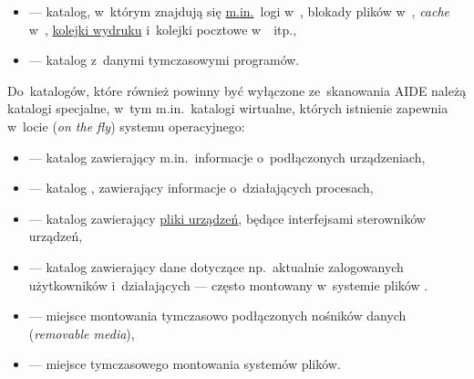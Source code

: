 \documentclass[thesis]{subfiles}
\begin{document}
\begin{itemize}
	\item {} --- katalog, w~którym znajdują się \href{http://www.linuxpl.org/SAG/x547.html}{m.in.}~logi w~, blokady plików w~, \emph{cache} w~, \href{http://www.tldp.org/HOWTO/Printing-Usage-HOWTO-2.html}{kolejki wydruku} i~kolejki pocztowe w~~itp.,
	\item {} --- katalog z~danymi tymczasowymi programów.
\end{itemize}

 Do~katalogów, które również powinny być wyłączone ze~skanowania AIDE należą katalogi specjalne, w~tym m.in.~katalogi wirtualne, których istnienie zapewnia w~locie (\emph{on the fly})  systemu operacyjnego:\mynobreakpar

\begin{itemize}
	\item {} --- katalog zawierający m.in.~informacje o~podłączonych urządzeniach,
	\item {} --- katalog , zawierający informacje o~działających procesach,
	\item {} --- katalog zawierający \href{https://en.wikipedia.org/wiki/Device_file}{pliki urządzeń}, będące interfejsami sterowników urządzeń,
	\item {} --- katalog zawierający dane dotyczące np.~aktualnie zalogowanych użytkowników i~działających  --- często montowany w~systemie plików .
	\item {} --- miejsce montowania tymczasowo podłączonych nośników danych (\emph{removable media}),
	\item {} --- miejsce tymczasowego montowania systemów plików.
\end{itemize}
\end{document}
